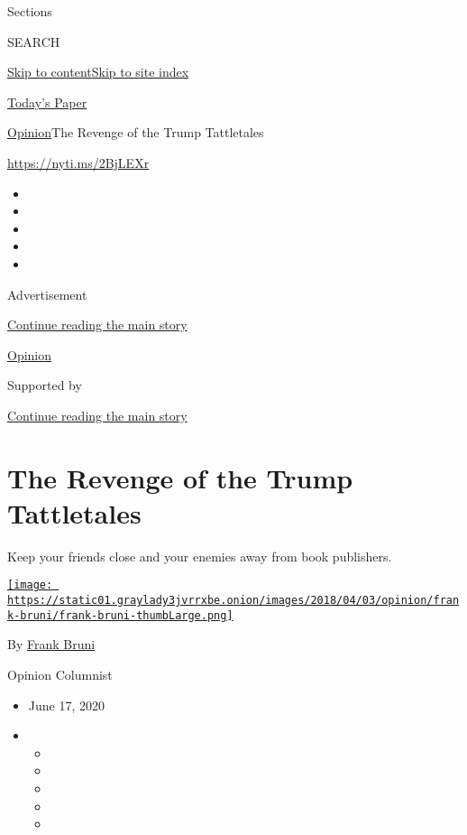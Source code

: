 Sections

SEARCH

\protect\hyperlink{site-content}{Skip to
content}\protect\hyperlink{site-index}{Skip to site index}

\href{https://myaccount.nytimes3xbfgragh.onion/auth/login?response_type=cookie\&client_id=vi}{}

\href{https://www.nytimes3xbfgragh.onion/section/todayspaper}{Today's
Paper}

\href{/section/opinion}{Opinion}\textbar{}The Revenge of the Trump
Tattletales

\url{https://nyti.ms/2BjLEXr}

\begin{itemize}
\item
\item
\item
\item
\item
\end{itemize}

Advertisement

\protect\hyperlink{after-top}{Continue reading the main story}

\href{/section/opinion}{Opinion}

Supported by

\protect\hyperlink{after-sponsor}{Continue reading the main story}

\hypertarget{the-revenge-of-the-trump-tattletales}{%
\section{The Revenge of the Trump
Tattletales}\label{the-revenge-of-the-trump-tattletales}}

Keep your friends close and your enemies away from book publishers.

\href{https://www.nytimes3xbfgragh.onion/by/frank-bruni}{\texttt{[image: https://static01.graylady3jvrrxbe.onion/images/2018/04/03/opinion/frank-bruni/frank-bruni-thumbLarge.png]}}

By \href{https://www.nytimes3xbfgragh.onion/by/frank-bruni}{Frank Bruni}

Opinion Columnist

\begin{itemize}
\item
  June 17, 2020
\item
  \begin{itemize}
  \item
  \item
  \item
  \item
  \item
  \end{itemize}
\end{itemize}

